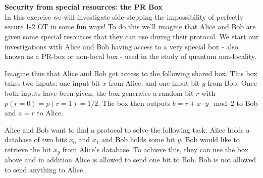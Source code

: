 \chapter{}

\begin{exercises}

\item {\bf Security from special resources: the PR Box}\\
In this exercise we will investigate side-stepping the impossibility of perfectly secure 1-2 OT in some   fun ways! To do this we'll imagine that Alice and Bob are given some special resources that they can use during their protocol. We start our investigations with Alice and Bob having access to a very special box - also known as a PR-box or non-local box - used in the study of quantum non-locality.

Imagine thus that Alice and Bob get access to the following shared box. This box takes two inputs: one input bit \(x\) from Alice, and one input bit \(y\) from Bob. Once both inputs have been given, the box generates a random bit \(r\) with \(p(r=0)=p(r=1)=1/2\). The box then outputs \( b = r+ x\cdot y \mod 2\) to Bob and \( a = r\) to Alice.

Alice and Bob want to find a protocol to solve the following task: Alice holds a database of two bits \(x_0\) and \(x_1\) and Bob holds some bit \(y\). Bob would like to retrieve the bit \(x_y\) from Alice's database. To achieve this, they can use the box above and in addition Alice is allowed to send one bit to Bob. Bob is not allowed to send anything to Alice.


\end{exercises}
